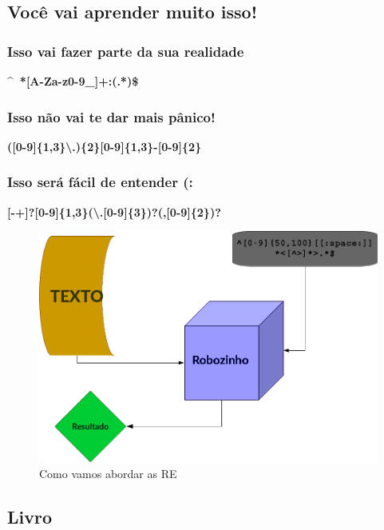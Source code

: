 \subsection{Você vai aprender muito isso!}
\begin{frame}
\frametitle{Isso vai fazer parte da sua realidade}
\centering
\bf
\Large{\textasciicircum~*[A-Za-z0-9\_]+:(.*)\$}
\end{frame}
\begin{frame}
\frametitle{Isso não vai te dar mais pânico!}
\centering
\bf
\Large{([0-9]\{1,3\}\textbackslash.)\{2\}[0-9]\{1,3\}-[0-9]\{2\}}
\end{frame}
\begin{frame}
\frametitle{Isso será fácil de entender (:}
\centering
\bf
\Large{[-+]?[0-9]\{1,3\}(\textbackslash.[0-9]\{3\})?(,[0-9]\{2\})?}
\end{frame}
\begin{frame}
\begin{figure}
\includegraphics[height=0.75\textheight]{./imagens/re/como-vai-funcionar.png}
\caption{Como vamos abordar as RE}
\end{figure}
\end{frame}

\subsection{Livro}

